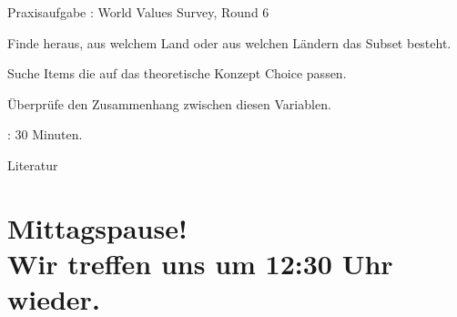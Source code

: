\documentclass[11pt]{beamer}
\begin{document}
\begin{frame}{Praxisaufgabe}
	: World Values Survey, Round 6

	\begin{nolist}
		\item Finde heraus, aus welchem Land oder aus welchen Ländern das Subset besteht.
		\item Suche Items die auf das theoretische Konzept Choice passen.
		\item Überprüfe den Zusammenhang zwischen diesen Variablen.
	\end{nolist}

	: 30 Minuten.
\end{frame}

\renewcommand*{\bibfont}{\scriptsize}

\begin{frame}[allowframebreaks]{Literatur}
	\nocite{*}
	\printbibliography[heading = none]
\end{frame}



\section{Mittagspause! \\ Wir treffen uns um 12:30 Uhr wieder.}
\end{document}

